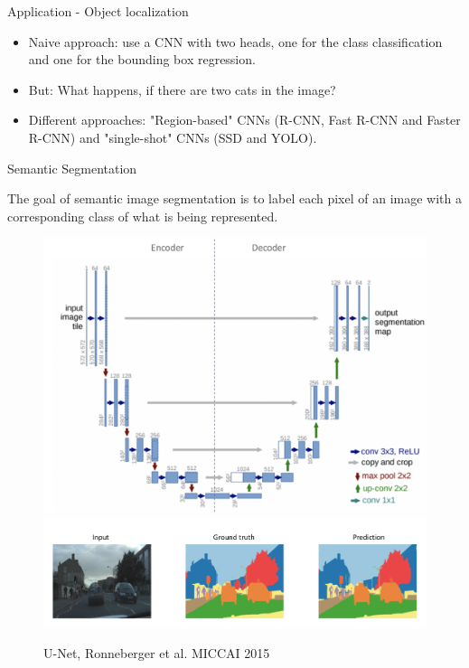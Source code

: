 \begin{vbframe}{Application - Object localization}
\begin{figure}
            \end{figure}
            \begin{itemize}
            \item Naive approach: use a CNN with two heads, one for the class classification and one for the bounding box regression.
            \item But: What happens, if there are two cats in the image?
                \item Different approaches: "Region-based" CNNs (R-CNN, Fast R-CNN and Faster R-CNN) and "single-shot" CNNs (SSD and YOLO).
            \end{itemize}

            \end{vbframe}
         
\begin{vbframe}{Semantic Segmentation}

The goal of semantic image segmentation is to label each pixel of an image with a corresponding class of what is being represented. 

\begin{figure}
\centering
\begin{minipage}{.5\textwidth}
  \centering
  \includegraphics[width=.9\linewidth]{figure/unet.png}
\end{minipage}%
\begin{minipage}{.5\textwidth}
  \centering
  \includegraphics[width=.9\linewidth]{figure/semantic_segmentation.png}
\end{minipage}
\caption\tiny{U-Net, Ronneberger et al. MICCAI 2015}
\end{figure}

\end{vbframe}

